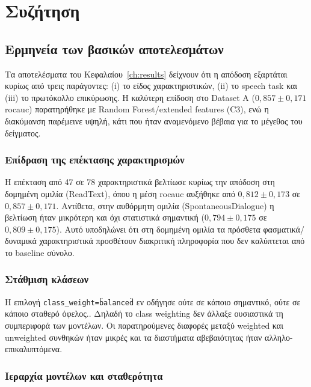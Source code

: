 
\chapter{Συζήτηση}
\label{ch:discussion}

\section{Ερμηνεία των βασικών αποτελεσμάτων}

Τα αποτελέσματα του Κεφαλαίου~\ref{ch:results} δείχνουν ότι η απόδοση εξαρτάται κυρίως από τρεις παράγοντες: (i) το είδος χαρακτηριστικών, (ii) το speech task και (iii) το πρωτόκολλο επικύρωσης. 
Η καλύτερη επίδοση στο Dataset A ($0{,}857 \pm 0{,}171$ \gls{rocauc}) παρατηρήθηκε με Random Forest/extended features (C3), ενώ η διακύμανση παρέμεινε υψηλή, κάτι που ήταν αναμενόμενο βέβαια για το μέγεθος του δείγματος.

\subsection{Επίδραση της επέκτασης χαρακτηρισμών}

Η επέκταση από 47 σε 78 χαρακτηριστικά βελτίωσε κυρίως την απόδοση στη δομημένη ομιλία (ReadText), όπου η μέση \gls{rocauc} αυξήθηκε από $0{,}812 \pm 0{,}173$ σε $0{,}857 \pm 0{,}171$. 
Αντίθετα, στην αυθόρμητη ομιλία (SpontaneousDialogue) η βελτίωση ήταν μικρότερη και όχι στατιστικά σημαντική ($0{,}794 \pm 0{,}175$ σε $0{,}809 \pm 0{,}175$). 
Αυτό υποδηλώνει ότι στη δομημένη ομιλία τα πρόσθετα φασματικά/δυναμικά χαρακτηριστικά προσθέτουν διακριτική πληροφορία που δεν καλύπτεται από το baseline σύνολο.

\subsection{Στάθμιση κλάσεων}

Η επιλογή \texttt{class\_weight=\"balanced\"} εν οδήγησε ούτε σε κάποιο σημαντικό, ούτε σε κάποιο σταθερό όφελος.. 
Δηλαδή το class weighting δεν άλλαξε ουσιαστικά τη συμπεριφορά των μοντέλων. Οι παρατηρούμενες διαφορές μεταξύ weighted και unweighted συνθηκών ήταν μικρές και τα διαστήματα αβεβαιότητας ήταν αλληλο-επικαλυπτόμενα.

\subsection{Ιεραρχία μοντέλων και σταθερότητα}

